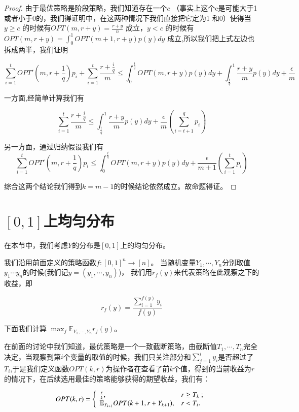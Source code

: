\documentclass[bachelor]{thuthesis}
\begin{document}
\begin{proof}
由于最优策略是阶段策略，我们知道存在一个$c$ （事实上这个c是可能大于1或者小于0的，我们得证明中，在这两种情况下我们直接把它定为1 和0）使得当$y\ge c$ 的时候有$OPT(m,r+y)=\frac{r+y}{n}$ 成立，$y< c$ 的时候有$OPT(m,r+y)=\int_{0}^{1}OPT(m+1,r+y)p(y)dy$ 成立,所以我们把上式左边也拆成两半，我们证明

\[\sum_{i=1}^{t}OPT'(m,r+\frac{1}{q})p_i+\sum_{i=1}^{t}\frac{r+\frac{i}{q}}{m}
\le \int_{0}^{\frac{t}{q}}OPT(m,r+y)p(y)dy+\int_{\frac{t}{q}}^{1}\frac{r+y}{m}p(y)dy+\frac{\epsilon}{m}\]

一方面,经简单计算我们有

\[\sum_{i=1}^{t}\frac{r+\frac{i}{q}}{m}\le \int_{\frac{t}{q}}^{1}\frac{r+y}{m}p(y)dy+\frac{\epsilon}{m}(\sum_{i=t+1}^{q}p_i)\]

另一方面，通过归纳假设我们有
\[\sum_{i=1}^{t}OPT'(m,r+\frac{1}{q})p_i\le \int_{0}^{\frac{t}{q}}OPT(m,r+y)p(y)dy+\frac{\epsilon}{m+1}(\sum_{i=1}^{t}p_i)\]

综合这两个结论我们得到$k=m-1$的时候结论依然成立。故命题得证。

\end{proof}



\section{$[0,1]$上均匀分布}

在本节中，我们考虑$Y$的分布是$[0,1]$上的均匀分布。

我们沿用前面定义的策略函数$f:[0,1]^n\to [n]$。 当随机变量$Y_1 ,\cdots, Y_n$分别取值$y_1\cdots y_n$的时候(我们记$y=(y_1,\cdots,y_n)$)， 我们用$r_f(y)$来代表策略在此观察之下的收益，即

\[r_f(y)=\frac{\sum_{i=1}^{f(y)} y_i}{f(y)}\]

下面我们计算 $\max_{f} \mathbb{E}_{Y_1,\cdots,Y_n} r_f(y)$。

在前面的讨论中我们知道，最优策略是一个一致截断策略，由截断值$T_1 ,\cdots, T_n$完全决定，当观察到第$i$个变量的取值的时候，我们只关注部分和$\sum_{j=1}^{i}y_i$是否超过了$T_i$,于是我们定义函数$OPT(k,r)$为操作者在查看了前$k$个值，得到的当前收益为$r$的情况下，在后续选用最佳的策略能够获得的期望收益，我们有：

$$OPT(k,r)=
\left\{
\begin{array}{ll}
\frac {r} {k}, & \hbox{$r\geq T_k$ ;} \\
\mathbb{E}_{Y_{k+1}} OPT(k+1,r+Y_{k+1}), & \hbox{$r<T_i$.}
\end{array}
\right.$$
\end{document}
